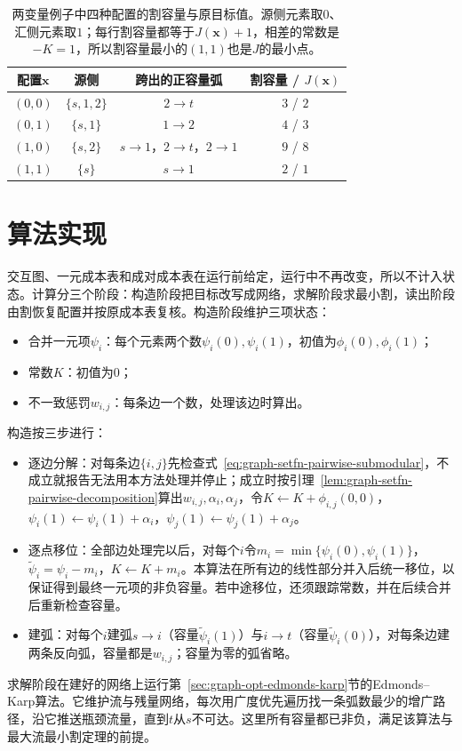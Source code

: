 \begin{table}[!htb]
  \centering
  \begin{tabular}{cccc}
    \toprule
    配置$\bm x$ & 源侧 & 跨出的正容量弧 & 割容量 / $J(\bm x)$ \\
    \midrule
    $(0,0)$ & $\{s,1,2\}$ & $2\to t$ & $3$ / $2$ \\
    $(0,1)$ & $\{s,1\}$ & $1\to2$ & $4$ / $3$ \\
    $(1,0)$ & $\{s,2\}$ & $s\to1$，$2\to t$，$2\to1$ & $9$ / $8$ \\
    $(1,1)$ & $\{s\}$ & $s\to1$ & $2$ / $1$ \\
    \bottomrule
  \end{tabular}
  \caption{两变量例子中四种配置的割容量与原目标值。源侧元素取$0$、汇侧元素取$1$；每行割容量都等于$J(\bm x)+1$，相差的常数是$-K=1$，所以割容量最小的$(1,1)$也是$J$的最小点。}
  \label{tab:graph-setfn-cut-check}
\end{table}

\section{算法实现}
\label{sec:graph-setfn-cut-solving}

交互图、一元成本表和成对成本表在运行前给定，运行中不再改变，所以不计入状态。计算分三个阶段：构造阶段把目标改写成网络，求解阶段求最小割，读出阶段由割恢复配置并按原成本表复核。构造阶段维护三项状态：
\begin{itemize}
  \item 合并一元项$\psi_i$：每个元素两个数$\psi_i(0),\psi_i(1)$，初值为$\phi_i(0),\phi_i(1)$；
  \item 常数$K$：初值为$0$；
  \item 不一致惩罚$w_{i,j}$：每条边一个数，处理该边时算出。
\end{itemize}
构造按三步进行：
\begin{itemize}
  \item 逐边分解：对每条边$\{i,j\}$先检查式~\eqref{eq:graph-setfn-pairwise-submodular}，不成立就报告无法用本方法处理并停止；成立时按引理~\ref{lem:graph-setfn-pairwise-decomposition}算出$w_{i,j},\alpha_i,\alpha_j$，令$K\gets K+\phi_{i,j}(0,0)$，$\psi_i(1)\gets\psi_i(1)+\alpha_i$，$\psi_j(1)\gets\psi_j(1)+\alpha_j$。
  \item 逐点移位：全部边处理完以后，对每个$i$令$m_i=\min\{\psi_i(0),\psi_i(1)\}$，$\tilde\psi_i=\psi_i-m_i$，$K\gets K+m_i$。本算法在所有边的线性部分并入后统一移位，以保证得到最终一元项的非负容量。若中途移位，还须跟踪常数，并在后续合并后重新检查容量。
  \item 建弧：对每个$i$建弧$s\to i$（容量$\tilde\psi_i(1)$）与$i\to t$（容量$\tilde\psi_i(0)$），对每条边建两条反向弧，容量都是$w_{i,j}$；容量为零的弧省略。
\end{itemize}
求解阶段在建好的网络上运行第~\ref{sec:graph-opt-edmonds-karp}节的Edmonds--Karp算法。它维护流与残量网络，每次用广度优先遍历找一条弧数最少的增广路径，沿它推送瓶颈流量，直到$t$从$s$不可达。这里所有容量都已非负，满足该算法与最大流最小割定理的前提。

